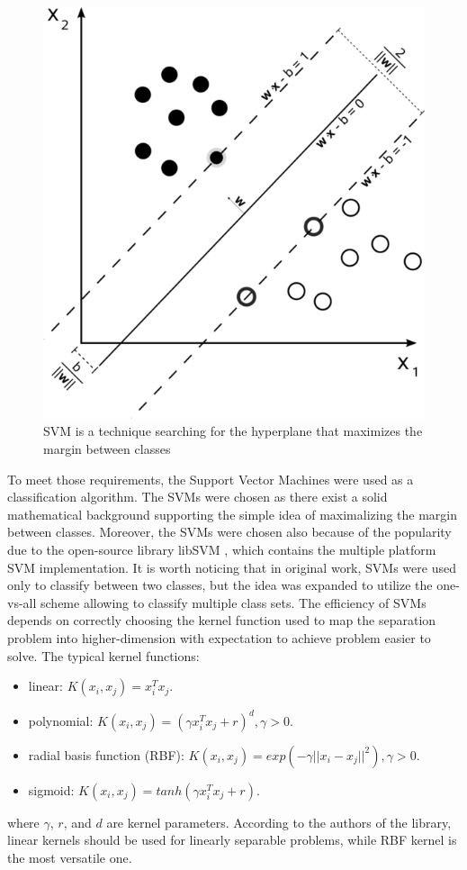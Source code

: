 \begin{figure}[htb]
\centering
 \includegraphics[width=0.6\columnwidth]{figures/SVM.png}
 \caption[]{SVM is a technique searching for the hyperplane that maximizes the margin between classes\footnotemark}
 \label{svmmargin}
\end{figure}



To meet those requirements, the Support Vector Machines \cite{Cortes:SVM} were used as a classification algorithm.
The SVMs were chosen as there exist a solid mathematical background supporting the simple idea of maximalizing the margin between classes.
Moreover, the SVMs were chosen also because of the popularity due to the open-source library libSVM \cite{libSVM}, which contains the multiple platform SVM implementation.
It is worth noticing that in original work, SVMs were used only to classify between two classes, but the idea was expanded to utilize the one-vs-all scheme allowing to classify multiple class sets.
The efficiency of SVMs depends on correctly choosing the kernel function used to map the separation problem into higher-dimension with expectation to achieve problem easier to solve.
The typical kernel functions:
\begin{itemize}
\item linear: $K(x_i, x_j) = x_i^Tx_j$.
\item polynomial: $K(x_i, x_j) = (\gamma x_i^Tx_j + r)^d, \gamma > 0$.
\item radial basis function (RBF): $K(x_i, x_j) = exp(-\gamma ||x_i - x_j||^2), \gamma > 0$.
\item sigmoid: $K(x_i, x_j) = tanh(\gamma x_i^Tx_j+r)$.
\end{itemize}
where $\gamma$, $r$, and $d$ are kernel parameters. According to the authors of the library, linear kernels should be used for linearly separable problems, while RBF kernel is the most versatile one.

